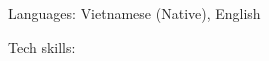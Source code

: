 

\begin{cvskills}

  \cvskill
    {Languages:} %
    {Vietnamese (Native), English} %

  \cvskill
    {Tech skills:} %
    {\newline} %


\end{cvskills}

